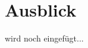 \documentclass[conference]{IEEEtran}
\begin{document}
\section{Ausblick}
wird noch eingefügt...

\newpage
\printglossary[style=altlist,title=Glossar]
\vspace{12pt}
\end{document}
